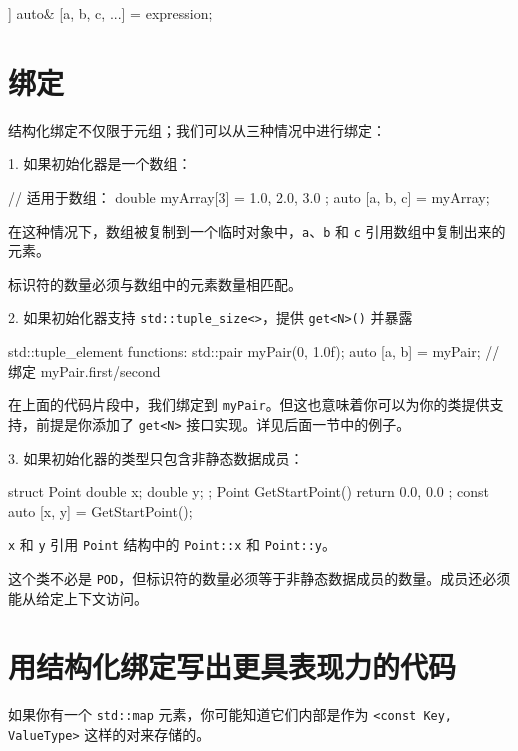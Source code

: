 \begin{codebox}[cpp]
[[maybe_unused]] auto& [a, b, c, ...] = expression;
\end{codebox}

\section{绑定}

结构化绑定不仅限于元组；我们可以从三种情况中进行绑定：

1. 如果初始化器是一个数组：

\begin{codebox}[cpp]
// 适用于数组：
double myArray[3] = { 1.0, 2.0, 3.0 };
auto [a, b, c] = myArray;
\end{codebox}

在这种情况下，数组被复制到一个临时对象中，\texttt{a}、\texttt{b} 和 \texttt{c} 引用数组中复制出来的元素。

标识符的数量必须与数组中的元素数量相匹配。

2. 如果初始化器支持 \texttt{std::tuple\_size<>}，提供 \texttt{get<N>()} 并暴露

\begin{codebox}[cpp]
std::tuple_element functions:
std::pair myPair(0, 1.0f);
auto [a, b] = myPair; // 绑定 myPair.first/second
\end{codebox}

在上面的代码片段中，我们绑定到 \texttt{myPair}。但这也意味着你可以为你的类提供支持，前提是你添加了 \texttt{get<N>} 接口实现。详见后面一节中的例子。

3. 如果初始化器的类型只包含非静态数据成员：

\begin{codebox}[cpp]
struct Point
{ double x;
double y; };
Point GetStartPoint() { return { 0.0, 0.0 }; }
const auto [x, y] = GetStartPoint();
\end{codebox}

\texttt{x} 和 \texttt{y} 引用 \texttt{Point} 结构中的 \texttt{Point::x} 和 \texttt{Point::y}。

这个类不必是 \texttt{POD}，但标识符的数量必须等于非静态数据成员的数量。成员还必须能从给定上下文访问。

\section{用结构化绑定写出更具表现力的代码}

如果你有一个 \texttt{std::map} 元素，你可能知道它们内部是作为 \texttt{<const Key, ValueType>} 这样的对来存储的。

